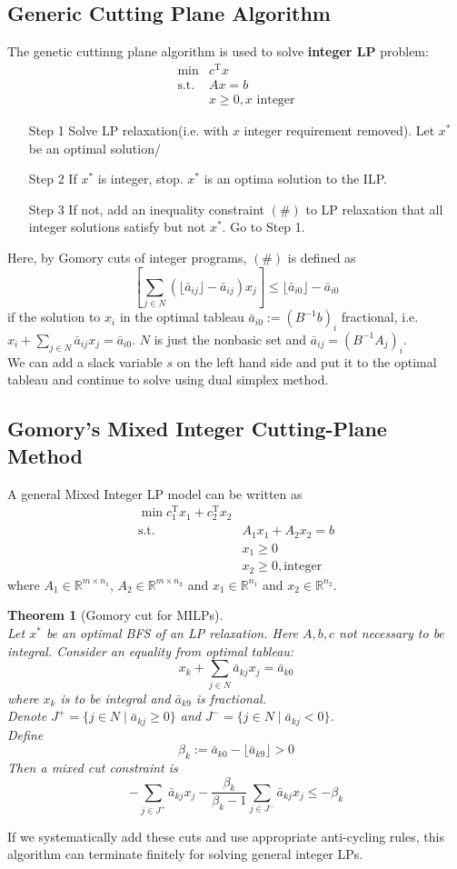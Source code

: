 \documentclass[12pt]{article}
\newcommand{\st}{\mathrm{s.t.}}
\newcommand{\T}{\mathrm{T}}
\newtheorem{theorem}{Theorem}[section]
\theoremstyle{definition}
\begin{document}
\subsection{Generic Cutting Plane Algorithm}
The genetic cuttinng plane algorithm is used to solve \textbf{integer LP} problem:
\begin{align*}
\min & c^\T x\\
\st  & Ax=b\\
&x\geq 0, x \text{ integer}
\end{align*}
\begin{itemize}
  \item[Step 1] Solve LP relaxation(i.e. with $x$ integer requirement removed). Let $x^\ast$ be an optimal solution/
  \item[Step 2] If $x^\ast$ is integer, stop. $x^\ast$ is an optima solution to the ILP.
  \item[Step 3] If not, add an inequality constraint $(\#)$ to LP relaxation that all integer solutions satisfy but not $x^\ast$. Go to Step 1.
\end{itemize}
Here, by Gomory cuts of integer programs, $(\#)$ is defined as
\[
[\sum_{j\in N}(\lfloor \bar{a}_{ij}\rfloor -\bar{a}_{ij})x_j]\leq \lfloor \bar{a}_{i0}\rfloor - \bar{a}_{i0}
\]
if the solution to $x_i$ in the optimal tableau $\bar{a}_{i0}:=(B^{-1}b)_i$ fractional, i.e. $x_i+\sum_{j\in N}\bar{a}_{ij}x_j=\bar{a}_{i0}$. $N$ is just the nonbasic set and $\bar{a}_{ij}=(B^{-1}A_j)_i$.\\
We can add a slack variable $s$ on the left hand side and put it to the optimal tableau and continue to solve using dual simplex method.
\subsection{Gomory's Mixed Integer Cutting-Plane Method}
A general Mixed Integer LP model can be written as
\begin{align*}
\min  c_1^\T x_1 + c_2^\T x_2\\
\st & A_1x_1+A_2x_2=b\\
&x_1\geq 0\\
&x_2\geq 0, \text{integer}
\end{align*}
where $A_1\in\mathbb{R}^{m\times n_1}$, $A_2\in\mathbb{R}^{m\times n_2}$ and $x_1\in\mathbb{R}^{n_1}$ and $x_2\in\mathbb{R}^{n_2}$.
\begin{theorem}[Gomory cut for MILPs]
\hfill\\\normalfont Let $x^\ast$ be an optimal BFS of an LP relaxation. Here $A,b,c$ not necessary to be integral. Consider an equality from \textit{optimal tableau}:
\[
x_k+\sum_{j\in N}\bar{a}_{kj}x_j=\bar{a}_{k0}
\]
where $x_k$ is to be integral and $\bar{a}_{k9}$ is fractional.\\
Denote $J^{+}=\{j\in N\mid \bar{a}_{kj}\geq 0\}$ and $J^{-}=\{j\in N\mid \bar{a}_{kj}< 0\}$.\\
Define
\[
\beta_k:=\bar{a}_{k0}-\lfloor \bar{a}_{k9}\rfloor >0
\]
Then a mixed cut constraint is
\[
-\sum_{j\in J^{+}}\bar{a}_{kj}x_j-\frac{\beta_k}{\beta_k-1}\sum_{j\in J^{-}}\bar{a}_{kj}x_j\leq -\beta_k
\]
\end{theorem}
If we systematically add these cuts and use appropriate anti-cycling rules, this algorithm can terminate finitely for solving general integer LPs.
\end{document}
